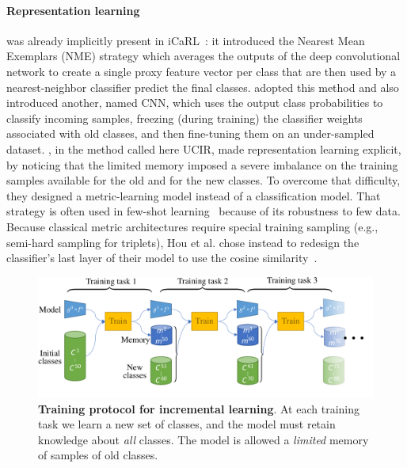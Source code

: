 \paragraph{Representation learning} was already implicitly present in
iCaRL~\citep{rebuffi2017icarl}: it introduced the Nearest Mean Exemplars (NME) strategy which
averages the outputs of the deep convolutional network to create a single proxy feature vector per
class that are then used by a nearest-neighbor classifier predict the final classes.
\cite{hou2019ucir} adopted this method and also introduced another, named CNN, which uses the output
class probabilities to classify incoming samples, freezing (during training) the classifier weights
associated with old classes, and then fine-tuning them on an under-sampled dataset.
\cite{hou2019ucir}, in the method called here UCIR, made representation learning explicit, by
noticing that the limited memory imposed a severe imbalance on the training samples available for
the old and for the new classes. To overcome that difficulty, they designed a metric-learning model
instead of a classification model. That strategy is often used in few-shot
learning~\citep{gidaris2018fewshot_wo_forgetting} because of its robustness to few data. Because
classical metric architectures require special training sampling (e.g., semi-hard sampling for
triplets), Hou et al. chose instead to redesign the classifier's last layer of their model to use
the cosine similarity~\citep{luo2018cosine_classifier}.


\begin{figure}[tb]
    \begin{center}
        \includegraphics[width=1.0\linewidth]{images/podnet/protocol}
    \end{center}
    \caption{\textbf{Training protocol for incremental learning}. At each training task we learn a
        new set of classes, and the model must retain knowledge about \textit{all} classes. The
        model is allowed a \textit{limited} memory of samples of old classes.}
    \label{fig:podnet_protocol}
\end{figure}


